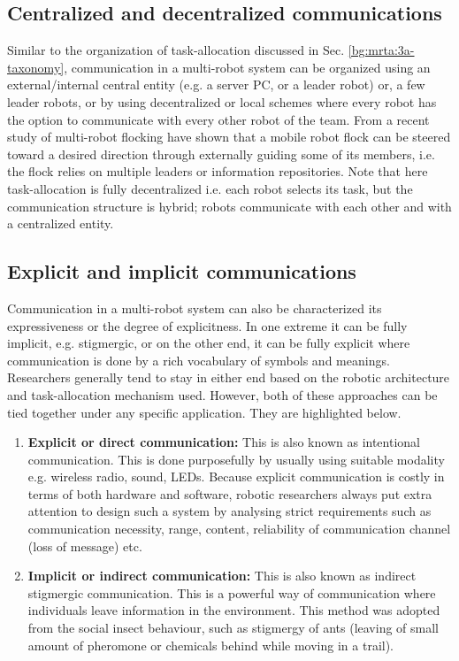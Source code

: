 \subsection*{Centralized and decentralized communications}
Similar to the organization of task-allocation discussed in Sec. \ref{bg:mrta:3a-taxonomy}, communication in a multi-robot system can be organized using an external/internal central entity (e.g. a server PC, or a leader robot) or, a few leader robots, or by using decentralized or local schemes where every robot has the option to communicate with every other robot of the team. From a recent study of multi-robot flocking  have shown that a mobile robot flock can be steered toward a desired direction through externally guiding some of its members, i.e. the flock relies on multiple leaders or information repositories. Note that here task-allocation is fully decentralized i.e. each robot selects its task, but the communication structure is hybrid; robots communicate with each other and with a centralized entity.
\subsection*{Explicit and implicit communications}
Communication in a multi-robot system can also be characterized its expressiveness or the degree of explicitness. In one extreme it can be fully implicit, e.g. stigmergic, or on the other end, it can be fully explicit where communication is done by a rich vocabulary of symbols and meanings. Researchers generally tend to stay in either end based on the robotic architecture and task-allocation mechanism used. However, both of these approaches can be tied together under any specific application. They are highlighted below.
\begin{enumerate}
\item \textbf{Explicit or direct communication: }
This is also known as intentional communication. This is done purposefully by usually using suitable modality e.g. wireless radio, sound, LEDs. Because explicit communication is costly in terms of both hardware and software, robotic researchers always put extra attention to design such a system by analysing strict requirements such as communication necessity, range, content, reliability of communication channel (loss of message) etc.
%
\item \textbf{Implicit or indirect communication:} 
This is also known as indirect stigmergic communication. This is a powerful way of communication where individuals leave information in the environment. This method was adopted from the social insect behaviour, such as stigmergy of ants (leaving of small amount of pheromone or chemicals behind while moving in a trail).
\end{enumerate}
